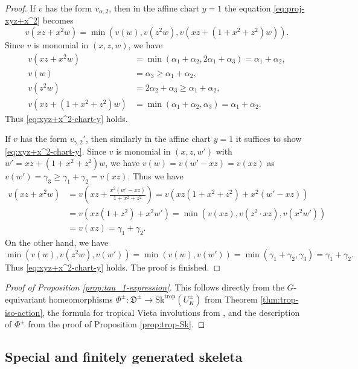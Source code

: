 \documentclass[reqno, 12pt]{amsart}
\theoremstyle{definition}
\newcommand{\trop}{\mathrm{trop}}
\newcommand{\fD}{\mathfrak{D}}
\newcommand{\Sk}{\mathrm{Sk}}
\numberwithin{equation}{section}
\begin{document}
\begin{proof}
If $v$ has the form $v_{\alpha,2}$, then in the affine chart $y=1$ the equation \eqref{eq:proj-xyz+x^2} becomes
\begin{equation}\label{eq:xyz+x^2-chart-y}
    v(xz+x^2 w) = \min(v(w), v(z^2 w), v(xz + (1+x^2+z^2)w)). 
\end{equation}
Since $v$ is monomial in $(x,z,w)$, we have
\begin{align*}
v(xz+x^2 w) & = \min(\alpha_1+\alpha_2, 2\alpha_1 + \alpha_3) = \alpha_1+\alpha_2,\\
v(w) & = \alpha_3\geq \alpha_1+\alpha_2,\\
v(z^2w) & = 2\alpha_2+\alpha_3\geq \alpha_1+\alpha_2,\\
v(xz + (1+x^2+z^2)w) & = \min(\alpha_1+\alpha_2, \alpha_3) = \alpha_1+\alpha_2.
\end{align*}
Thus \eqref{eq:xyz+x^2-chart-y} holds.

If $v$ has the form $v_{\gamma,2}'$, then similarly in the affine chart $y=1$ it suffices to show \eqref{eq:xyz+x^2-chart-y}.
Since $v$ is monomial in $(x,z,w')$ with $w' = xz+(1+x^2+z^2)w$, we have $v(w) = v(w'-xz) = v(xz)$ as $v(w') = \gamma_3\geq \gamma_1+\gamma_2 = v(xz)$. Thus we have 
\begin{align*}
v(xz+x^2 w)&  = v(xz + \tfrac{x^2(w'-xz)}{1+x^2+z^2}) = v(xz(1+x^2+z^2) + x^2(w' - xz) )\\ 
& = v(xz(1+z^2) + x^2 w')  = \min( v(xz), v(z^2\cdot xz), v(x^2 w'))\\& = v(xz) = \gamma_1+\gamma_2.
\end{align*}
On the other hand, we have 
\[
\min(v(w), v(z^2 w), v(w')) = \min(v(w), v(w')) = \min (\gamma_1+\gamma_2, \gamma_3) = \gamma_1+\gamma_2.
\]
Thus \eqref{eq:xyz+x^2-chart-y} holds. The proof is finished.
\end{proof}

\begin{proof}[Proof of Proposition \ref{prop:tau_1-expression}]
This follows directly from the $G$-equivariant homeomorphisms $\Phi^{\pm}:\fD^{\pm}\to \Sk^{\trop}(U_K^{\pm})$ from Theorem \ref{thm:trop-iso-action}, the formula for tropical Vieta involutions from \cite[(3.1)--(3.3)]{Jan23}, and the description of $\Phi^{\pm}$ from the proof of Proposition \ref{prop:trop-Sk}.
\end{proof}

\subsection{Special and finitely generated skeleta}
\end{document}
